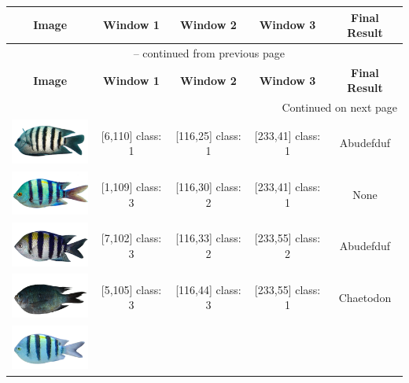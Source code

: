 \begin{longtable}{|c|c|c|c|c|}
	\hline
	\textbf{Image} & \textbf{Window 1} & \textbf{Window 2} & \textbf{Window 3} & \textbf{Final Result} \\
	\hline
	\endfirsthead
	\multicolumn{5}{c}{{\tablename\ \thetable{} -- continued from previous page}} \\
	\hline
	\textbf{Image} & \textbf{Window 1} & \textbf{Window 2} & \textbf{Window 3} & \textbf{Final Result} \\
	\hline
	\endhead
	\hline \multicolumn{5}{|r|}{{Continued on next page}} \\ \hline
	\endfoot
	\hline
	\endlastfoot
	\includegraphics[width=3cm]{gambar/dataset_validasi/Abudefduf01}
	& [6,110] class: 1 & [116,25] class: 1 & [233,41] class: 1 & Abudefduf \\
	\hline
	\includegraphics[width=3cm]{gambar/dataset_validasi/Abudefduf02}
	& [1,109] class: 3 & [116,30] class: 2 & [233,41] class: 1 & None \\
	\hline
	\includegraphics[width=3cm]{gambar/dataset_validasi/Abudefduf03}
	& [7,102] class: 3 & [116,33] class: 2 & [233,55] class: 2 & Abudefduf \\
	\hline
	\includegraphics[width=3cm]{gambar/dataset_validasi/Abudefduf04}
	& [5,105] class: 3 & [116,44] class: 3 & [233,55] class: 1 & Chaetodon \\
	\hline
	\includegraphics[width=3cm]{gambar/dataset_validasi/Abudefduf05}

\end{longtable}
